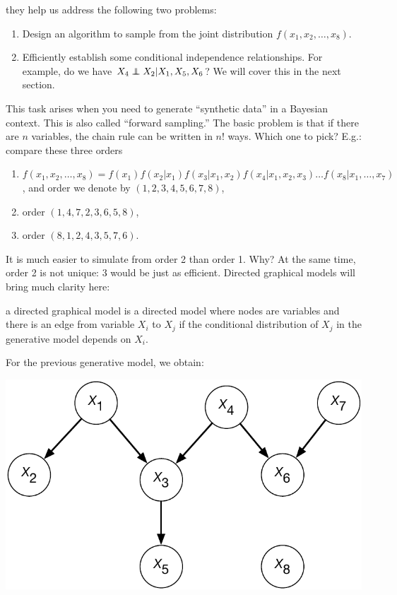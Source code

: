 \documentclass{article}
\begin{document}
 they help us address the following two problems:
\begin{enumerate}
	\item Design an algorithm to sample from the joint distribution $f(x_1, x_2, \dots, x_8)$.
	\item Efficiently establish some conditional independence relationships. For example, do we have $X_4 \independent X_2 | X_1, X_5, X_6$? We will cover this in the next section.
\end{enumerate}

 This task arises when you need to generate ``synthetic data'' in a Bayesian context. This is also called ``forward sampling.'' The basic problem is that if there are $n$ variables, the chain rule can be written in $n!$ ways. Which one to pick? E.g.: compare these three orders
\begin{enumerate}
	\item $f(x_1, x_2, \dots, x_8) = f(x_1) f(x_2 | x_1) f(x_3 | x_1, x_2) f(x_4 | x_1, x_2, x_3) \dots f(x_8 | x_1, \dots, x_7)$, and order we denote by $(1,2,3,4,5,6,7,8)$,
	\item order $(1, 4, 7, 2, 3, 6, 5, 8)$,
	\item order $(8, 1, 2, 4, 3, 5, 7, 6)$.
\end{enumerate}
It is much easier to simulate from order 2 than order 1. Why? At the same time, order 2 is not unique: 3 would be just as efficient. Directed graphical models will bring much clarity here:

 a directed graphical model is a directed model where nodes are variables and there is an edge from variable $X_i$ to $X_j$ if the conditional distribution of $X_j$ in the generative model depends on $X_i$. 

 For the previous generative model, we obtain:
\begin{center}
	\includegraphics[width=0.5\linewidth]{figures/graph-model} 
\end{center}
\end{document}
